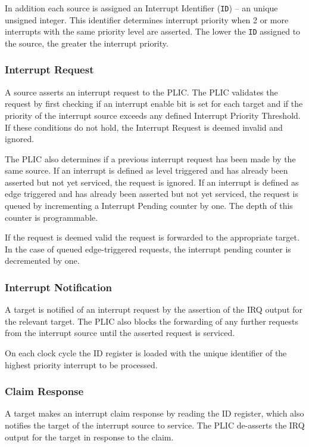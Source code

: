 \documentclass[]{article}
\begin{document}
In addition each source is assigned an Interrupt Identifier
(\texttt{ID}) -- an unique unsigned integer. This identifier determines
interrupt priority when 2 or more interrupts with the same priority
level are asserted. The lower the \texttt{ID} assigned to the source,
the greater the interrupt priority.

\subsubsection{Interrupt Request}

A source asserts an interrupt request to the PLIC. The PLIC validates
the request by first checking if an interrupt enable bit is set for each
target and if the priority of the interrupt source exceeds any defined
Interrupt Priority Threshold. If these conditions do not hold, the
Interrupt Request is deemed invalid and ignored.

The PLIC also determines if a previous interrupt request has been made
by the same source. If an interrupt is defined as level triggered and
has already been asserted but not yet serviced, the request is ignored.
If an interrupt is defined as edge triggered and has already been
asserted but not yet serviced, the request is queued by incrementing a
Interrupt Pending counter by one. The depth of this counter is
programmable.

If the request is deemed valid the request is forwarded to the
appropriate target. In the case of queued edge-triggered requests, the
interrupt pending counter is decremented by one.

\subsubsection{Interrupt Notification}

A target is notified of an interrupt request by the assertion of the IRQ
output for the relevant target. The PLIC also blocks the forwarding of
any further requests from the interrupt source until the asserted
request is serviced.

On each clock cycle the ID register is loaded with the unique identifier
of the highest priority interrupt to be processed.

\subsubsection{Claim Response} \label{sec:claim-response}

A target makes an interrupt claim response by reading the ID register,
which also notifies the target of the interrupt source to service. The
PLIC de-asserts the IRQ output for the target in response to the claim.
\end{document}
